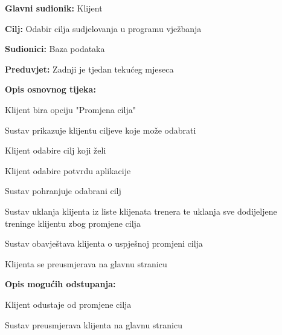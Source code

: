					\noindent {}
					\begin{packed_item}
	
						\item \textbf{Glavni sudionik: }Klijent
						\item  \textbf{Cilj:} Odabir cilja sudjelovanja u programu vježbanja
						\item  \textbf{Sudionici:} Baza podataka
						\item  \textbf{Preduvjet:} Zadnji je tjedan tekućeg mjeseca
						\item  \textbf{Opis osnovnog tijeka:}

						
						\item[] \begin{packed_enum}
	
							\item Klijent bira opciju "Promjena cilja"
							\item Sustav prikazuje klijentu ciljeve koje može odabrati
                            \item Klijent odabire cilj koji želi
							\item Klijent odabire potvrdu aplikacije
       					\item Sustav pohranjuje odabrani cilj
       					\item Sustav uklanja klijenta iz liste klijenata trenera te uklanja sve dodijeljene treninge klijentu zbog promjene cilja
       					\item Sustav obavještava klijenta o uspješnoj promjeni cilja
						\item Klijenta se preusmjerava na glavnu stranicu
							
						\end{packed_enum}
						\item  \textbf{Opis mogućih odstupanja:}
						\item[] \begin{packed_item}
	
							\item[4.a] Klijent odustaje od promjene cilja
							\item[] \begin{packed_enum}

                                \item Sustav preusmjerava klijenta na glavnu stranicu

								
							\end{packed_enum}
							
						\end{packed_item}
      
					\end{packed_item}
						

